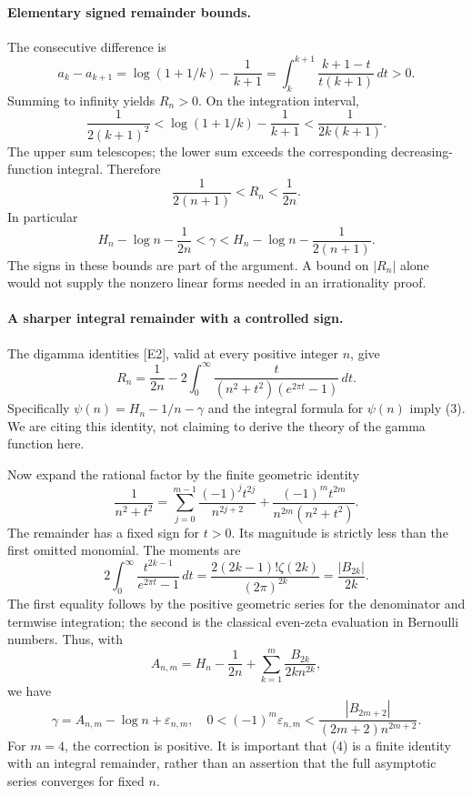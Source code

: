 \documentclass[11pt]{article}
\begin{document}
\paragraph{Elementary signed remainder bounds.}
The consecutive difference is
\[
 a_k-a_{k+1}=\log(1+1/k)-\frac1{k+1}
          =\int_k^{k+1}\frac{k+1-t}{t(k+1)}\,dt>0.
\]
Summing to infinity yields $R_n>0$. On the integration interval,
\[
 \frac1{2(k+1)^2}
 <\log(1+1/k)-\frac1{k+1}
 <\frac1{2k(k+1)}.
\]
The upper sum telescopes; the lower sum exceeds the corresponding
decreasing-function integral. Therefore
\[
                         \frac1{2(n+1)}<R_n<\frac1{2n}.  \tag{1}
\]
In particular
\[
 H_n-\log n-\frac1{2n}<\gamma
             <H_n-\log n-\frac1{2(n+1)}.                \tag{2}
\]
The signs in these bounds are part of the argument. A bound on
$|R_n|$ alone would not supply the nonzero linear forms needed in an
irrationality proof.

\paragraph{A sharper integral remainder with a controlled sign.}
The digamma identities [E2], valid at every positive integer $n$, give
\[
 R_n=\frac1{2n}
       -2\int_0^\infty\frac{t}{(n^2+t^2)(e^{2\pi t}-1)}\,dt.       \tag{3}
\]
Specifically $\psi(n)=H_n-1/n-\gamma$ and the integral formula for
$\psi(n)$ imply (3). We are citing this identity, not claiming to
derive the theory of the gamma function here.

Now expand the rational factor by the finite geometric identity
\[
 \frac1{n^2+t^2}
 =\sum_{j=0}^{m-1}\frac{(-1)^jt^{2j}}{n^{2j+2}}
   +\frac{(-1)^mt^{2m}}{n^{2m}(n^2+t^2)}.               \tag{4}
\]
The remainder has a fixed sign for $t>0$. Its magnitude is strictly
less than the first omitted monomial. The moments are
\[
 2\int_0^\infty\frac{t^{2k-1}}{e^{2\pi t}-1}\,dt
       =\frac{2(2k-1)!\zeta(2k)}{(2\pi)^{2k}}
       =\frac{|B_{2k}|}{2k}.
\]
The first equality follows by the positive geometric series for the
denominator and termwise integration; the second is the classical
even-zeta evaluation in Bernoulli numbers. Thus, with
\[
 A_{n,m}=H_n-\frac1{2n}
                    +\sum_{k=1}^m\frac{B_{2k}}{2k n^{2k}},
\]
we have
\[
 \gamma=A_{n,m}-\log n+\varepsilon_{n,m},\quad
 0<(-1)^m\varepsilon_{n,m}
                <\frac{|B_{2m+2}|}{(2m+2)n^{2m+2}}.     \tag{5}
\]
For $m=4$, the correction is positive. It is important that (4) is a
finite identity with an integral remainder, rather than an assertion
that the full asymptotic series converges for fixed $n$.
\end{document}
